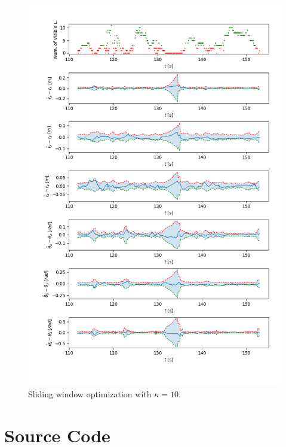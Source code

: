 \documentclass[a4paper]{article}
\begin{document}
\begin{figure}[H]
    \centering
    \includegraphics[width=\textwidth]{code/sliding_window_10.png}
    \caption{Sliding window optimization with $\kappa= 10$.}
    \label{fig:5c}
\end{figure}


\clearpage
\printbibliography

\appendix

\clearpage
\section{Source Code}
\label{sourcecode}
\end{document}
